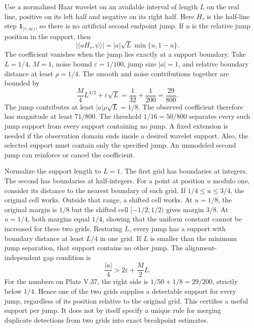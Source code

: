Use a normalized Haar wavelet on an available interval of length $L$ on the real line, positive on its left half and negative on its right half. Here $H_\tau$ is the half-line step $\mathbf1_{[\tau,\infty)}$, so there is no artificial second endpoint jump.
If $u$ is the relative jump position in the support, then
\[
|\langle aH_\tau,\psi\rangle|
=|a|\sqrt L\min\{u,1-u\}.
\]
The coefficient vanishes when the jump lies exactly at a support boundary.
Take $L=1/4$, $M=1$, noise bound $\varepsilon=1/100$, jump size $|a|=1$, and relative boundary distance at least $\rho=1/4$. The smooth and noise contributions together are bounded by
\[
\frac M4L^{3/2}+\varepsilon\sqrt L
=\frac1{32}+\frac1{200}=\frac{29}{800}.
\]
The jump contributes at least $|a|\rho\sqrt L=1/8$. The observed coefficient therefore has magnitude at least $71/800$. The threshold $1/16=50/800$ separates every such jump support from every support containing no jump.
A fixed extension is needed if the observation domain ends inside a desired wavelet support. Also, the selected support must contain only the specified jump. An unmodeled second jump can reinforce or cancel the coefficient.

Normalize the support length to $L=1$. The first grid has boundaries at integers. The second has boundaries at half-integers. For a point at position $u$ modulo one, consider its distance to the nearest boundary of each grid.
If $1/4\le u\le3/4$, the original cell works. Outside that range, a shifted cell works. At $u=1/8$, the original margin is $1/8$ but the shifted cell $[-1/2,1/2)$ gives margin $3/8$. At $u=1/4$, both margins equal $1/4$, showing that the uniform constant cannot be increased for these two grids.
Restoring $L$, every jump has a support with boundary distance at least $L/4$ in one grid. If $L$ is smaller than the minimum jump separation, that support contains no other jump.
The alignment-independent gap condition is
\[
\frac{|a|}{4}>2\varepsilon+\frac M2L.
\]
For the numbers on Plate V.37, the right side is $1/50+1/8=29/200$, strictly below $1/4$. Hence one of the two grids supplies a detectable support for every jump, regardless of its position relative to the original grid.
This certifies a useful support per jump. It does not by itself specify a unique rule for merging duplicate detections from two grids into exact breakpoint estimates.

